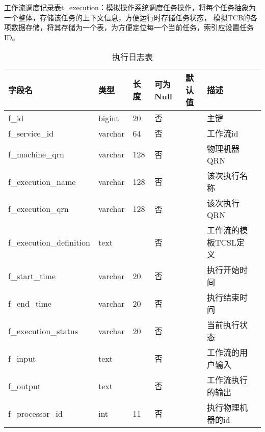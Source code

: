 工作流调度记录表t\_execution：模拟操作系统调度任务操作，将每个任务抽象为一个整体，存储该任务的上下文信息，方便运行时存储任务状态，
模拟TCB的各项数据存储，将其存储为一个表，为方便定位每一个当前任务，索引应设置任务ID。
\begin{table}[H]
    \centering
    \caption{执行日志表}
    \label{tab:t_execution}
    \begin{tabular}{lllllll}
        \toprule
        字段名	&类型	&长度	&可为Null &默认值	&描述 \\
        \midrule
        f\_id	&bigint	&20 &否 & &主键 \\
        f\_service\_id	&varchar	&64 &否 & &工作流id \\
        f\_machine\_qrn	&varchar	&128 &否 & &物理机器QRN \\
        f\_execution\_name	&varchar	&128 &否 & &该次执行名称 \\
        f\_execution\_qrn	&varchar	&128 &否 & &该次执行QRN \\
        f\_execution\_definition	&text	& &否 & &工作流的模板TCSL定义 \\
        f\_start\_time	&varchar	&20 &否 & &执行开始时间 \\
        f\_end\_time	&varchar	&20 &否 & &执行结束时间 \\
        f\_execution\_status	&varchar	&20 &否 & &当前执行状态\\
        f\_input	&text	& &否 & &工作流的用户输入 \\
        f\_output	&text	& &否 & &工作流执行的输出 \\
        f\_processor\_id	&int	&11 &否 & &执行物理机器的id \\
        \bottomrule
    \end{tabular}
\end{table}


